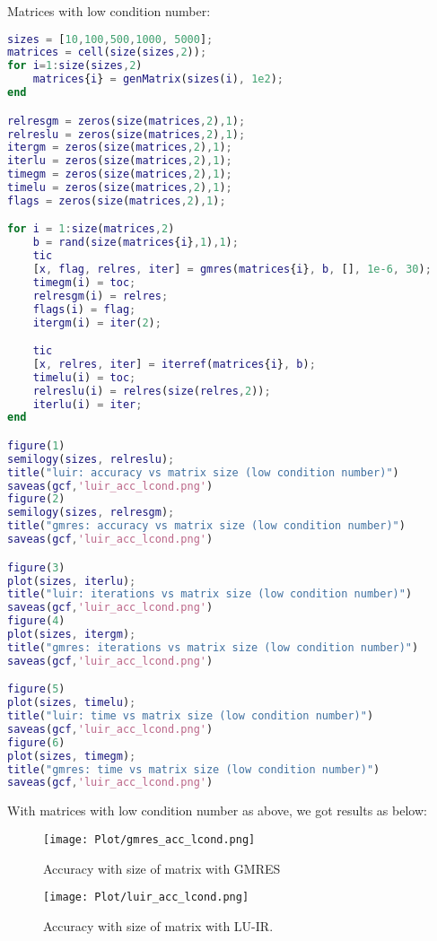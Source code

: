 Matrices with low condition number:
\begin{lstlisting}[language=matlab,caption=Matrix with low conditional number]
    sizes = [10,100,500,1000, 5000];
matrices = cell(size(sizes,2));
for i=1:size(sizes,2)
    matrices{i} = genMatrix(sizes(i), 1e2);
end

relresgm = zeros(size(matrices,2),1);
relreslu = zeros(size(matrices,2),1);
itergm = zeros(size(matrices,2),1);
iterlu = zeros(size(matrices,2),1);
timegm = zeros(size(matrices,2),1);
timelu = zeros(size(matrices,2),1);
flags = zeros(size(matrices,2),1);

for i = 1:size(matrices,2)
    b = rand(size(matrices{i},1),1);
    tic
    [x, flag, relres, iter] = gmres(matrices{i}, b, [], 1e-6, 30);
    timegm(i) = toc;
    relresgm(i) = relres;
    flags(i) = flag;
    itergm(i) = iter(2);

    tic
    [x, relres, iter] = iterref(matrices{i}, b);
    timelu(i) = toc;
    relreslu(i) = relres(size(relres,2));
    iterlu(i) = iter;
end

figure(1)
semilogy(sizes, relreslu);
title("luir: accuracy vs matrix size (low condition number)")
saveas(gcf,'luir_acc_lcond.png')
figure(2)
semilogy(sizes, relresgm);
title("gmres: accuracy vs matrix size (low condition number)")
saveas(gcf,'luir_acc_lcond.png')

figure(3)
plot(sizes, iterlu);
title("luir: iterations vs matrix size (low condition number)")
saveas(gcf,'luir_acc_lcond.png')
figure(4)
plot(sizes, itergm);
title("gmres: iterations vs matrix size (low condition number)")
saveas(gcf,'luir_acc_lcond.png')

figure(5)
plot(sizes, timelu);
title("luir: time vs matrix size (low condition number)")
saveas(gcf,'luir_acc_lcond.png')
figure(6)
plot(sizes, timegm);
title("gmres: time vs matrix size (low condition number)")
saveas(gcf,'luir_acc_lcond.png')

\end{lstlisting}
With matrices with low condition number as above, we got results as below:
\begin{figure}[ht]
     \begin{minipage}[b]{0.5\linewidth}
        \centering
   \texttt{[image: Plot/gmres\_acc\_lcond.png]}
        \caption{Accuracy with size of matrix with GMRES}
        \label{fig:image19}
    \end{minipage}
    \hspace{0.5cm} 
    \begin{minipage}[b]{0.5\linewidth}
        \centering
        \texttt{[image: Plot/luir\_acc\_lcond.png]}
        \caption{Accuracy with size of matrix with LU-IR.}
        \label{fig:image20}
    \end{minipage}
\end{figure}

